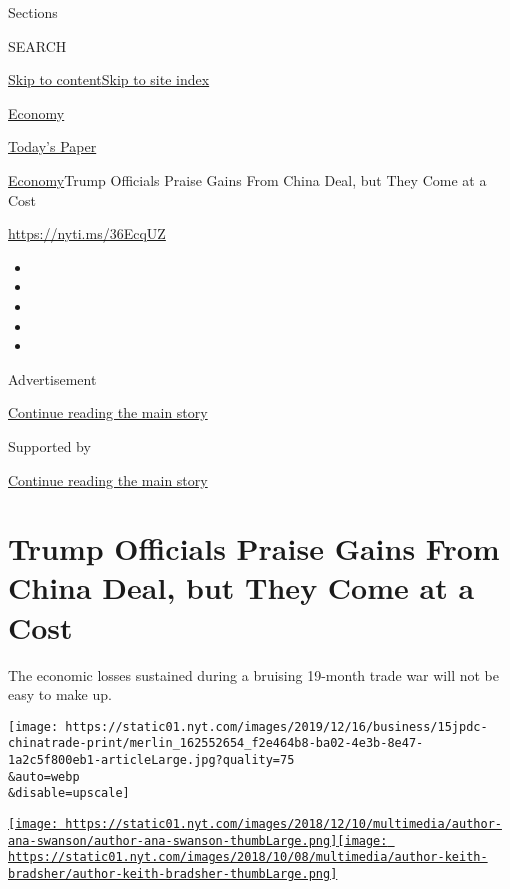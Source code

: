 Sections

SEARCH

\protect\hyperlink{site-content}{Skip to
content}\protect\hyperlink{site-index}{Skip to site index}

\href{https://www.nytimes.com/section/business/economy}{Economy}

\href{https://myaccount.nytimes.com/auth/login?response_type=cookie\&client_id=vi}{}

\href{https://www.nytimes.com/section/todayspaper}{Today's Paper}

\href{/section/business/economy}{Economy}\textbar{}Trump Officials
Praise Gains From China Deal, but They Come at a Cost

\url{https://nyti.ms/36EcqUZ}

\begin{itemize}
\item
\item
\item
\item
\item
\end{itemize}

Advertisement

\protect\hyperlink{after-top}{Continue reading the main story}

Supported by

\protect\hyperlink{after-sponsor}{Continue reading the main story}

\hypertarget{trump-officials-praise-gains-from-china-deal-but-they-come-at-a-cost}{%
\section{Trump Officials Praise Gains From China Deal, but They Come at
a
Cost}\label{trump-officials-praise-gains-from-china-deal-but-they-come-at-a-cost}}

The economic losses sustained during a bruising 19-month trade war will
not be easy to make up.

\texttt{[image: https://static01.nyt.com/images/2019/12/16/business/15jpdc-chinatrade-print/merlin\_162552654\_f2e464b8-ba02-4e3b-8e47-1a2c5f800eb1-articleLarge.jpg?quality=75\\\&auto=webp\\\&disable=upscale]}

\href{https://www.nytimes.com/by/ana-swanson}{\texttt{[image: https://static01.nyt.com/images/2018/12/10/multimedia/author-ana-swanson/author-ana-swanson-thumbLarge.png]}}\href{https://www.nytimes.com/by/keith-bradsher}{\texttt{[image: https://static01.nyt.com/images/2018/10/08/multimedia/author-keith-bradsher/author-keith-bradsher-thumbLarge.png]}}

